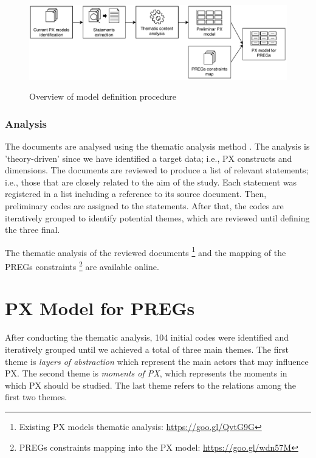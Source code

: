 \begin{figure}[bth]
\myfloatalign
{\includegraphics[width=\linewidth]{gfx/model/modelDefiniton}} \quad
\caption{Overview of model definition procedure}\label{fig:modelDefiniton}
\end{figure}

\subsubsection{Analysis}
The documents are analysed using the thematic analysis method \autocite{Braun}. The analysis is 'theory-driven' since we have identified a target data; i.e., \ac{PX} constructs and dimensions. The documents are reviewed to produce a list of relevant statements; i.e., those that are closely related to the aim of the study. Each statement was registered in a list including a reference to its source document. Then, preliminary codes are assigned to the statements. After that, the codes are iteratively grouped to identify potential themes, which are reviewed until defining the three final.

The thematic analysis of the reviewed documents \footnote{Existing PX models thematic analysis: \url{https://goo.gl/QvtG9G}} and the mapping of the \acp{PREG} constraints \footnote{PREGs constraints mapping into the PX model: \url{https://goo.gl/wdn57M}} are available online.

\section{PX Model for PREGs} %
\label{sec:preg_px_model}
After conducting the thematic analysis, 104 initial codes were identified and iteratively grouped until we achieved a total of three main themes. The first theme is \textit{layers of abstraction} which represent the main actors that may influence \ac{PX}. The second theme is \textit{moments of \ac{PX}}, which represents the moments in which \ac{PX} should be studied. The last theme refers to the relations among the first two themes.

